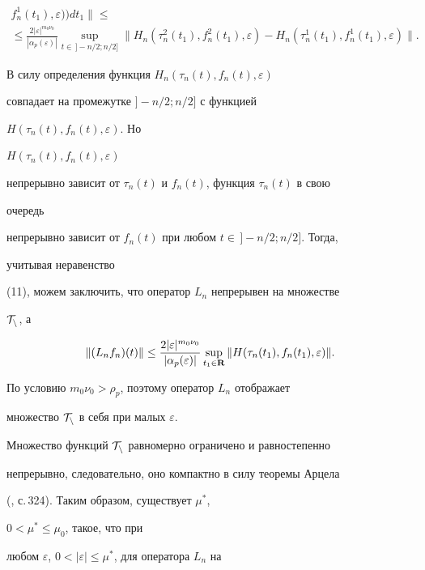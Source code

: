 \begin{pf}
\begin{multline}
f^1_n(t_1),\varepsilon))d t_1\bigg\|\le \\ 


% 


\le\frac{2|\varepsilon|^{m_0\nu_0}}{|\alpha_p(\varepsilon)|} 


\sup_{t\in\,]-n/2;n/2]}\|H_n(\tau^2_n(t_1), 


f^2_n(t_1),\varepsilon)-H_n(\tau^1_n(t_1), 


f^1_n(t_1),\varepsilon)\|. 


\end{multline} 


В силу определения функция $H_n(\tau_n(t),f_n(t),\varepsilon)$ 


совпадает на промежутке $]-n/2;n/2]$ с функцией 


$H(\tau_n(t),f_n(t),\varepsilon)$. Но 


$H(\tau_n(t),f_n(t),\varepsilon)$ 


непрерывно зависит от $\tau_n(t)$ и $f_n(t)$, функция $\tau_n(t)$ в свою 


очередь 


непрерывно зависит от $f_n(t)$ при любом $t\in\,]-n/2;n/2]$. Тогда, 


учитывая неравенство 


(11), можем заключить, что оператор $L_n$ непрерывен на множестве 


$\cal T_n$, а 


$$ 


\|(L_n f_n)(t)\|\le 


\frac{2|\varepsilon|^{m_0\nu_0}}{|\alpha_p(\varepsilon)|} 


\sup_{t_1\in\bold R}\|H(\tau_n(t_1),f_n(t_1),\varepsilon)\|. 


$$ 


По условию $m_0\nu_0>\rho_p$, поэтому оператор $L_n$ отображает 


множество $\cal T_n$ в себя при малых $\varepsilon$. 


 


Множество функций $\cal T_n$ равномерно ограничено и равностепенно 


непрерывно, следовательно, оно компактно в силу теоремы Арцела 


(\cite{6}, с.\,324). Таким образом, существует $\mu^*$, 


$0<\mu^*\le\mu_0$, такое, что при 


любом $\varepsilon$, $0<|\varepsilon|\le\mu^*$, для оператора $L_n$ на 



\end{pf}
